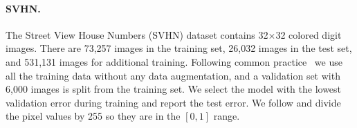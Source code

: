 \paragraph{SVHN.}
    The Street View House Numbers (SVHN) dataset \cite{svhn} contains 32$\times$32 colored digit images. There are 73,257 images in the training set, 26,032 images in the test set, and 531,131 images for additional training. Following common practice~\cite{maxout, stochastic, dsn, netinnet, sermanet2012convolutional} we use all the training data without any data augmentation, and a validation set with 6,000 images is split from the training set. We select the model with the lowest validation error during training and report the test error. We follow \cite{wide} and divide the pixel values by 255 so they are in the $[0, 1]$ range.
%

%

